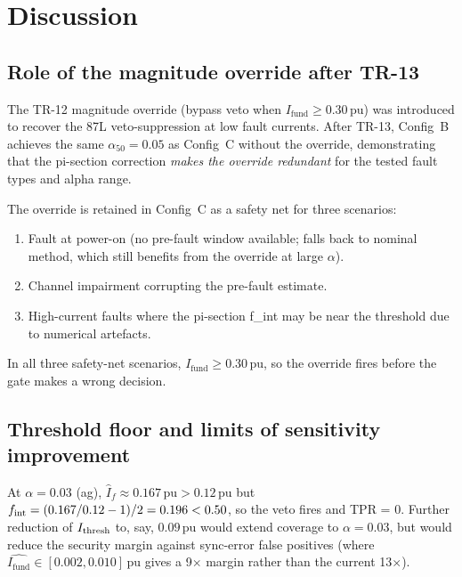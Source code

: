 \documentclass[11pt,a4paper]{article}
\newcommand{\Ifund}{I_{\mathrm{fund}}}
\newcommand{\alphafifty}{\alpha_{50}}
\newcommand{\pu}{\,\text{pu}}
\begin{document}
\section{Discussion}
\label{sec:discussion}

\subsection{Role of the magnitude override after TR-13}

The TR-12 magnitude override (bypass veto when $\Ifund \geq 0.30\pu$) was
introduced to recover the 87L veto-suppression at low fault currents.
After TR-13, Config~B achieves the same $\alphafifty = 0.05$ as Config~C
without the override, demonstrating that the pi-section correction
\emph{makes the override redundant} for the tested fault types and alpha
range.

The override is retained in Config~C as a safety net for three scenarios:
\begin{enumerate}
  \item Fault at power-on (no pre-fault window available; falls back to
        nominal method, which still benefits from the override at large $\alpha$).
  \item Channel impairment corrupting the pre-fault estimate.
  \item High-current faults where the pi-section f\_int may be near the
        threshold due to numerical artefacts.
\end{enumerate}

In all three safety-net scenarios, $\Ifund \geq 0.30\pu$, so the override
fires before the gate makes a wrong decision.

\subsection{Threshold floor and limits of sensitivity improvement}

At $\alpha = 0.03$ (ag), $\hat{I}_f \approx 0.167\pu > 0.12\pu$ but
$f_{\rm int} = (0.167/0.12-1)/2 = 0.196 < 0.50$, so the veto fires and
TPR = 0.  Further reduction of $I_{\rm thresh}$ to, say, $0.09\pu$ would
extend coverage to $\alpha = 0.03$, but would reduce the security margin
against sync-error false positives (where $\hat{\Ifund} \in [0.002, 0.010]\pu$
gives a 9$\times$ margin rather than the current 13$\times$).
\end{document}
